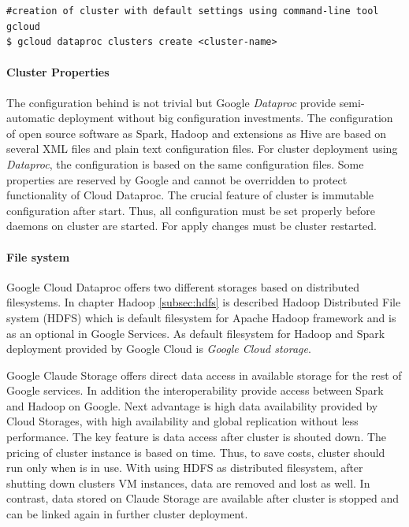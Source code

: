 \documentclass[a4paper,12pt,oneside]{report}
\begin{document}
	
	
	\begin{footnotesize}
		\begin{lstlisting}[style=mybash]
#creation of cluster with default settings using command-line tool gcloud
$ gcloud dataproc clusters create <cluster-name>
		\end{lstlisting}
	\end{footnotesize}
	
	
	\paragraph{Cluster Properties} The configuration behind is not trivial but Google
	\textit{Dataproc} provide 	semi-automatic deployment without big configuration investments.
	The configuration of open source software as Spark, Hadoop  and extensions as Hive	are based 
	on several XML files and plain text configuration files. For cluster deployment 
	using \textit{Dataproc}, the configuration is based on the same configuration	files. Some 
	properties are reserved by Google and cannot be overridden 
	to protect functionality of Cloud Dataproc. The crucial feature of cluster is
	immutable 	configuration after start. Thus, all configuration must be set 
	properly before daemons on cluster are started. For apply changes must be cluster
	restarted. 
	
	\paragraph{File system}
	Google Cloud Dataproc offers two different storages based on distributed
	filesystems. In chapter Hadoop \ref{subsec:hdfs} is described Hadoop Distributed File
	system (HDFS) which is default filesystem for Apache Hadoop framework and is as an optional in Google
	Services. As default filesystem for Hadoop and Spark deployment provided by Google Cloud is
	 \textit{Google Cloud storage}. 
	
	Google Claude Storage offers direct data access in available storage for the
	rest of Google 	services. In addition the interoperability provide access between Spark and
	Hadoop on Google. 	Next advantage is high data availability provided by Cloud
	Storages, with high availability and global replication without less
	performance. The key feature is data access after cluster is shouted down. The 
	pricing of cluster instance is based on time. Thus, to save costs, cluster
	should run only when is in use. With using HDFS as distributed filesystem, after 
	shutting down clusters VM instances, data are removed and lost as well. In contrast,
	data stored on 	Claude Storage are available after cluster is stopped and 
	can be linked again in further cluster deployment.
	
\end{document}

